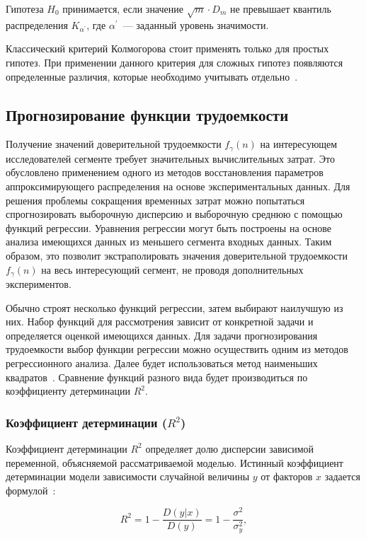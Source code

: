 \documentclass[a4paper, article, 14pt]{extarticle}
\begin{document}
\noindent Гипотеза $H_0$ принимается, если значение $\sqrt{m} \cdot D_m$ не превышает квантиль распределения $K_{\alpha^{'}}$, где $\alpha^{'}$~--- заданный уровень значимости.

Классический критерий Колмогорова стоит применять только для простых гипотез. При применении данного критерия для сложных гипотез появляются определенные различия, которые необходимо учитывать отдельно~\cite{kac}.

\subsection{Прогнозирование функции трудоемкости}\label{sec:compelixy_prediction}

Получение значений доверительной трудоемкости $f_{\gamma}(n)$ на интересующем исследователей сегменте требует значительных вычислительных затрат. Это обусловлено применением одного из методов восстановления параметров аппроксимирующего распределения на основе экспериментальных данных. Для решения проблемы сокращения временных затрат можно попытаться спрогнозировать выборочную дисперсию и выборочную среднюю с помощью функций регрессии. Уравнения регрессии могут быть построены на основе анализа имеющихся данных из меньшего сегмента входных данных. Таким образом, это позволит экстраполировать значения доверительной трудоемкости $f_{\gamma}(n)$ на весь интересующий сегмент, не проводя дополнительных экспериментов.

Обычно строят несколько функций регрессии, затем выбирают наилучшую из них. Набор функций для рассмотрения зависит от конкретной задачи и определяется оценкой имеющихся данных. Для задачи прогнозирования трудоемкости выбор функции регрессии можно осуществить одним из методов регрессионного анализа. Далее будет использоваться метод наименьших квадратов~\cite{hughes}. Сравнение функций разного вида будет производиться по коэффициенту детерминации $R^2$.

\subsubsection{Коэффициент детерминации ($R^2$)}\label{sec:coefficient_of_determination}

Коэффициент детерминации $R^2$ определяет долю дисперсии зависимой переменной, объясняемой рассматриваемой моделью. Истинный коэффициент детерминации модели зависимости случайной величины $y$ от факторов $x$ задается формулой~\cite{hughes}:

\begin{equation}\label{eq:true_coefficient_of_determination}
	R^2 = 1 - \frac{D(y | x)}{D(y)} = 1 - \frac{\sigma^2}{\sigma_y^2},
\end{equation}
\end{document}
